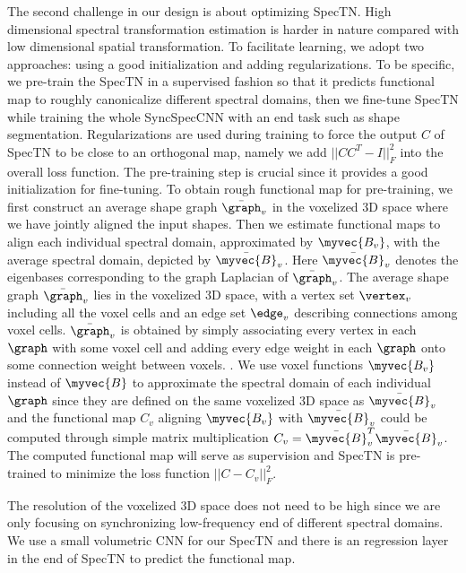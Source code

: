 The second challenge in our design is about optimizing SpecTN. High dimensional spectral transformation estimation is harder in nature compared with low dimensional spatial transformation. To facilitate learning, we adopt two approaches: using a good initialization and adding regularizations. To be specific, we pre-train the SpecTN in a supervised fashion so that it predicts functional map to roughly canonicalize different spectral domains, then we fine-tune SpecTN while training the whole SyncSpecCNN with an end task such as shape segmentation. Regularizations are used during training to force the output $C$ of SpecTN to be close to an orthogonal map, namely we add $||CC^T-I||_F^2$ into the overall loss function. The pre-training step is crucial since it provides a good initialization for fine-tuning. To obtain rough functional map for pre-training, we first construct an average shape graph $\bar{\graph}_v$ in the voxelized 3D space where we have jointly aligned the input shapes. Then we estimate functional maps to align each individual spectral domain, approximated by $\myvec{B_v}$, with the average spectral domain, depicted by $\bar{\myvec{B}}_v$. Here $\bar{\myvec{B}}_v$ denotes the eigenbases corresponding to the graph Laplacian of $\bar{\graph}_v$. The average shape graph $\bar{\graph}_v$ lies in the voxelized 3D space, with a vertex set $\vertex_v$ including all the voxel cells and an edge set $\edge_v$ describing connections among voxel cells. $\bar{\graph}_v$ is obtained by simply associating every vertex in each $\graph$ with some voxel cell and adding every edge weight in each $\graph$ onto some connection weight between voxels. . We use voxel functions $\myvec{B_v}$ instead of $\myvec{B}$ to approximate the spectral domain of each individual $\graph$ since they are defined on the same voxelized 3D space as $\bar{\myvec{B}}_v$ and the functional map $C_v$ aligning $\myvec{B_v}$ with $\bar{\myvec{B}}_v$ could be computed through simple matrix multiplication $C_v=\bar{\myvec{B}}_v^T\bar{\myvec{B}}_v$. The computed functional map will serve as supervision and SpecTN is pre-trained to minimize the loss function $||C-C_v||_F^2$.

The resolution of the voxelized 3D space does not need to be high since we are only focusing on synchronizing low-frequency end of different spectral domains. We use a small volumetric CNN \cite{qi2016volumetric} for our SpecTN and there is an regression layer in the end of SpecTN to predict the functional map.
